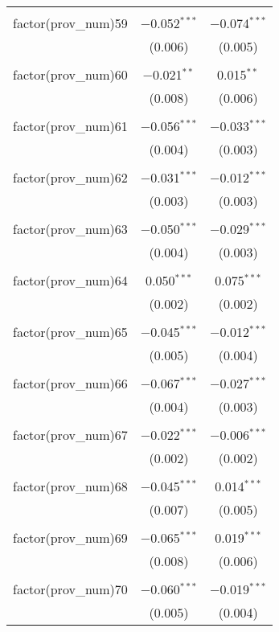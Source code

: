 \begin{table}[!htbp]
\begin{tabular}{@{\extracolsep{5pt}}lcc}
  & & \\ 
 factor(prov\_num)59 & $-$0.052$^{***}$ & $-$0.074$^{***}$ \\ 
  & (0.006) & (0.005) \\ 
  & & \\ 
 factor(prov\_num)60 & $-$0.021$^{**}$ & 0.015$^{**}$ \\ 
  & (0.008) & (0.006) \\ 
  & & \\ 
 factor(prov\_num)61 & $-$0.056$^{***}$ & $-$0.033$^{***}$ \\ 
  & (0.004) & (0.003) \\ 
  & & \\ 
 factor(prov\_num)62 & $-$0.031$^{***}$ & $-$0.012$^{***}$ \\ 
  & (0.003) & (0.003) \\ 
  & & \\ 
 factor(prov\_num)63 & $-$0.050$^{***}$ & $-$0.029$^{***}$ \\ 
  & (0.004) & (0.003) \\ 
  & & \\ 
 factor(prov\_num)64 & 0.050$^{***}$ & 0.075$^{***}$ \\ 
  & (0.002) & (0.002) \\ 
  & & \\ 
 factor(prov\_num)65 & $-$0.045$^{***}$ & $-$0.012$^{***}$ \\ 
  & (0.005) & (0.004) \\ 
  & & \\ 
 factor(prov\_num)66 & $-$0.067$^{***}$ & $-$0.027$^{***}$ \\ 
  & (0.004) & (0.003) \\ 
  & & \\ 
 factor(prov\_num)67 & $-$0.022$^{***}$ & $-$0.006$^{***}$ \\ 
  & (0.002) & (0.002) \\ 
  & & \\ 
 factor(prov\_num)68 & $-$0.045$^{***}$ & 0.014$^{***}$ \\ 
  & (0.007) & (0.005) \\ 
  & & \\ 
 factor(prov\_num)69 & $-$0.065$^{***}$ & 0.019$^{***}$ \\ 
  & (0.008) & (0.006) \\ 
  & & \\ 
 factor(prov\_num)70 & $-$0.060$^{***}$ & $-$0.019$^{***}$ \\ 
  & (0.005) & (0.004) \\ 

\end{tabular}
\end{table}
